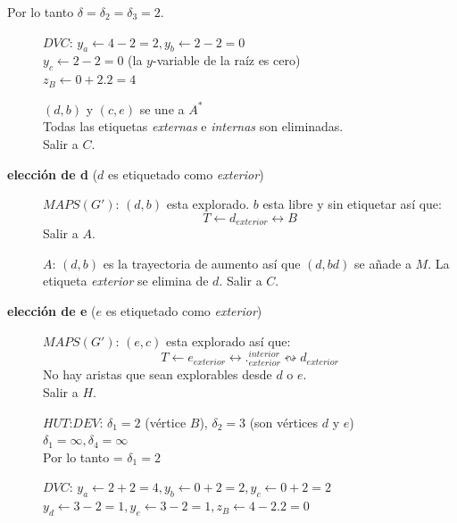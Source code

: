 \documentclass[10pt,a5paper]{book}
\begin{document}
\begin{description}
\begin{description}
    \quad Por lo tanto $\delta = \delta_2 = \delta_3 = 2$.
    \begin{description}
    \item[]\quad$DVC$: $y_a \leftarrow 4 - 2 = 2, y_b \leftarrow 2 - 2 = 0$\\
      $y_c \leftarrow 2 - 2 = 0$ (la $y$-variable de la raíz es cero)\\
      $z_B \leftarrow 0 + 2.2 = 4$
    \item[] $(d,b)$ y $(c,e)$ se une a $A^*$\\
      Todas las etiquetas \emph{externas} e \emph{internas} son eliminadas.\\
      Salir a $C$.
    \end{description}
  \end{description}
\item[] \textbf{elección de d} ($d$ es etiquetado como \emph{exterior})
  \begin{description}
  \item[] $MAPS(G')$: $(d,b)$ esta explorado. $b$ esta libre y sin etiquetar así que:
    \[ T \leftarrow d_{exterior} \longleftrightarrow B \]
    Salir a $A$.
  \item[] $A$: $(d,b)$ es la trayectoria de aumento así que $(d,bd)$ se añade a $M$. La etiqueta \emph{exterior} se elimina de $d$. Salir a $C$.
  \end{description}
\item[] \textbf{elección de e} ($e$ es etiquetado como \emph{exterior})
  \begin{description}
  \item[] $MAPS(G')$: $(e,c)$ esta explorado así que:
    \[ T \leftarrow e_{exterior} \longleftrightarrow .^{interior}_{exterior} \leftrightsquigarrow d_{exterior} \]
    No hay aristas que sean explorables desde $d$ o $e$.\\
    Salir a $H$.
  \item[] $HUT$:$DEV$: $\delta_1 = 2$ (vértice $B$), $\delta_2 = 3$ (son vértices $d$ y $e$)\\
    $\delta_1 = \infty, \delta_4 = \infty$\\
    Por lo tanto = $\delta_1 = 2$
    \item[]\quad$DVC$: $y_a \leftarrow 2 + 2 = 4, y_b \leftarrow 0 + 2 = 2, y_c \leftarrow 0 + 2 = 2$ \\
      $y_d \leftarrow 3 - 2 = 1, y_e \leftarrow 3 - 2 = 1, z_B \leftarrow 4 - 2.2 = 0$ 
    \end{description}
\end{description}
\end{document}

